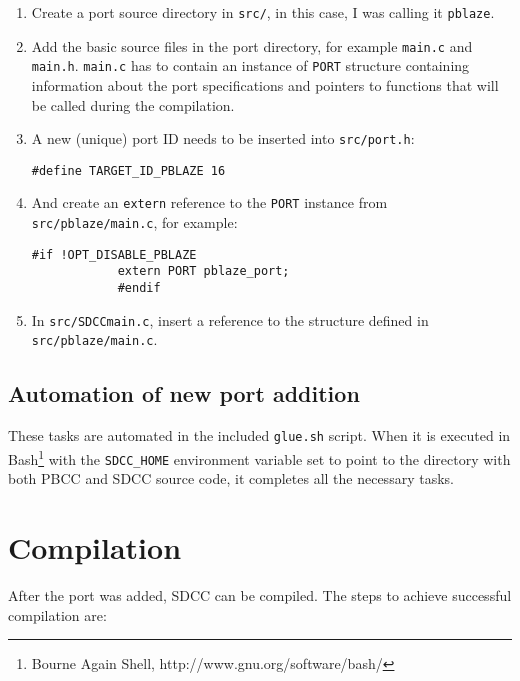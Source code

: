         \begin{enumerate}

        \item Create a port source directory in \texttt{src/}, in this case, I was calling it \texttt{pblaze}.

        \item Add the basic source files in the port directory, for example \texttt{main.c} and \texttt{main.h}. \texttt{main.c} has to contain an instance of \texttt{PORT} structure containing information about the port specifications and pointers to functions that will be called during the compilation.

        \item A new (unique) port ID needs to be inserted into \texttt{src/port.h}:

        \texttt{\#define TARGET\_ID\_PBLAZE    16}

        \item And create an \texttt{extern} reference to the \texttt{PORT} instance from \texttt{src/pblaze/main.c}, for example:

            \begin{verbatim}#if !OPT_DISABLE_PBLAZE
            extern PORT pblaze_port;
            #endif\end{verbatim}

        \item In \texttt{src/SDCCmain.c}, insert a reference to the structure defined in \texttt{src/pblaze/main.c}.

        \end{enumerate}

            \subsection{Automation of new port addition}

            These tasks are automated in the included \texttt{glue.sh} script. When it is executed in  Bash\footnote{Bourne Again Shell, http://www.gnu.org/software/bash/} with the \texttt{SDCC\_HOME} environment variable set to point to the directory with both PBCC and SDCC source code, it completes all the necessary tasks.

        \section{Compilation}

        After the port was added, SDCC can be compiled. The steps to achieve successful compilation are:

